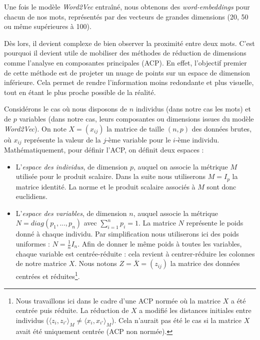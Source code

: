 \documentclass[11pt,french,french]{article}
\let\rmarkdownfootnote\footnote%
\def\footnote{\protect\rmarkdownfootnote}
\begin{document}
Une fois le modèle \emph{Word2Vec} entraîné, nous obtenons des
\emph{word-embeddings} pour chacun de nos mots, représentés par des
vecteurs de grandes dimensions (20, 50 ou même supérieures à 100).

Dès lors, il devient complexe de bien observer la proximité entre deux
mots. C'est pourquoi il devient utile de mobiliser des méthodes de
réduction de dimensions comme l'analyse en composantes principales
(ACP). En effet, l'objectif premier de cette méthode est de projeter un
nuage de points sur un espace de dimension inférieure. Cela permet de
rendre l'information moins redondante et plus visuelle, tout en étant le
plus proche possible de la réalité.

Considérons le cas où nous disposons de \(n\) individus (dans notre cas
les mots) et de \(p\) variables (dans notre cas, leurs composantes ou
dimensions issues du modèle \emph{Word2Vec}). On note \(X = (x_{ij})\)
la matrice de taille \((n,p)\) des données brutes, où \(x_{ij}\)
représente la valeur de la \(j\)-ème variable pour le \(i\)-ème
individu. Mathématiquement, pour définir l'ACP, on définit deux espaces
:

\begin{itemize}
\item
  L'\emph{espace des individus}, de dimension \(p\), auquel on associe
  la métrique \(M\) utilisée pour le produit scalaire. Dans la suite
  nous utiliserons \(M =I_p\) la matrice identité. La norme et le
  produit scalaire associés à \(M\) sont donc euclidiens.
\item
  L'\emph{espace des variables}, de dimension \(n\), auquel associe la
  métrique \(N=diag(p_1,...,p_n)\) avec \(\sum_{i=1}^np_i=1\). La
  matrice \(N\) représente le poids donné à chaque individu. Par
  simplification nous utiliserons ici des poids uniformes :
  \(N=\frac{1}{n}I_n\). Afin de donner le même poids à toutes les
  variables, chaque variable est centrée-réduite : cela revient à
  centrer-réduire les colonnes de notre matrice \(X\). Nous notons
  \(Z =\bar X= (z_{ij})\) la matrice des données centrées et
  réduites\footnote{Nous travaillons ici dans le cadre d'une ACP normée
    où la matrice \(X\) a été centrée puis réduite. La réduction de
    \(X\) a modifié les distances initiales entre individus
    (\(\langle z_i,z_{i'}\rangle_M \neq \langle x_i,x_{i'}\rangle_M\)).
    Cela n'aurait pas été le cas si la matrice \(X\) avait été
    uniquement centrée (ACP non normée).}.
\end{itemize}
\end{document}

